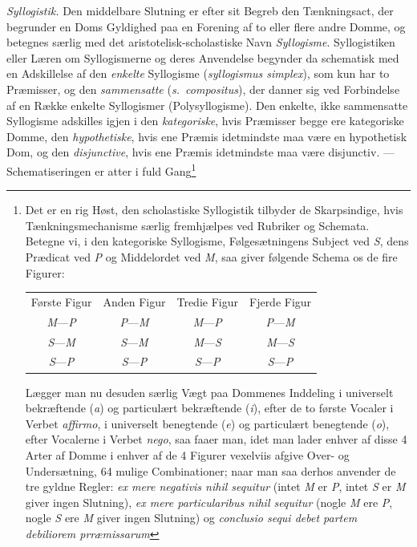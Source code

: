 \documentclass[12pt]{book}
\newcommand{\opage}[1]{\marginnote{\footnotesize\textit{[#1]}}}
\begin{document}
\emph{Syllogistik.} Den middelbare Slutning er efter sit Begreb den Tænkningsact, der begrunder en Doms Gyldighed paa en Forening af to eller flere andre Domme, og betegnes særlig med det aristotelisk-scholastiske Navn \emph{Syllogisme}. Syllogistiken eller Læren om Syllogismerne og deres Anvendelse begynder da schematisk med en Adskillelse af den \emph{enkelte} Syllogisme (\textit{syllogismus simplex}), som kun har to Præmisser, og den \emph{sammensatte} (\textit{s.\ compositus}), der danner sig ved Forbindelse af en Række enkelte Syllogismer (Polysyllogisme). Den enkelte, ikke sammensatte Syllogisme
\opage{316}adskilles igjen i den \emph{kategoriske}, hvis Præmisser begge ere kategoriske Domme, den \emph{hypothetiske}, hvis ene Præmis idetmindste maa være en hypothetisk Dom, og den \emph{disjunctive}, hvis ene Præmis idetmindste maa være disjunctiv. --- Schematiseringen er atter i fuld Gang\footnote{Det er en rig Høst, den scholastiske Syllogistik tilbyder de Skarpsindige, hvis Tænkningsmechanisme særlig fremhjælpes ved Rubriker og Schemata. Betegne vi, i den kategoriske Syllogisme, Følgesætningens Subject ved \textit{S}, dens Prædicat ved \textit{P} og Middelordet ved \textit{M}, saa giver følgende Schema os de fire Figurer:
\begin{center}\begin{tabular}{c|c|c|c}
Første Figur & Anden Figur & Tredie Figur & Fjerde Figur\\
\textit{M}---\textit{P} & \textit{P}---\textit{M} & \textit{M}---\textit{P} & \textit{P}---\textit{M}\\
\textit{S}---\textit{M} & \textit{S}---\textit{M} & \textit{M}---\textit{S} & \textit{M}---\textit{S}\\ \hline
\textit{S}---\textit{P} & \textit{S}---\textit{P} & \textit{S}---\textit{P} & \textit{S}---\textit{P}\\
\end{tabular}\end{center}
Lægger man nu desuden særlig Vægt paa Dommenes Inddeling i universelt bekræftende (\textit{a}) og particulært bekræftende (\textit{i}), efter de to første Vocaler i Verbet \textit{affirmo}, i universelt benegtende (\textit{e}) og particulært benegtende (\textit{o}), efter Vocalerne i Verbet \textit{nego}, saa faaer man, idet man lader enhver af disse 4 Arter af Domme i enhver af de 4 Figurer vexelviis afgive Over- og Undersætning, 64 mulige Combinationer; naar man saa derhos anvender de tre gyldne Regler: \textit{ex mere negativis nihil sequitur} (intet \textit{M} er \textit{P}, intet \textit{S} er \textit{M} giver ingen Slutning), \textit{ex mere particularibus nihil sequitur} (nogle \textit{M} ere \textit{P}, nogle \textit{S} ere \textit{M} giver ingen Slutning) og \textit{conclusio sequi debet partem debiliorem prræmissarum} %
}
\end{document}
